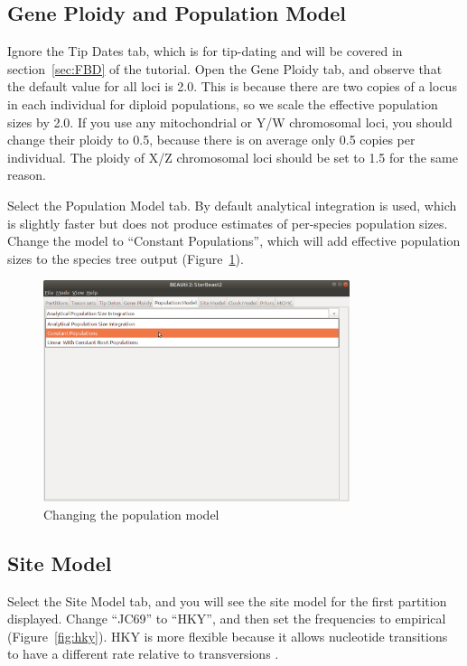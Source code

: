 \documentclass[12pt]{article}
\begin{document}
\subsection{Gene Ploidy and Population Model}
\label{subsec:ploidyAndPopModel}

Ignore the Tip Dates tab, which is for tip-dating and will be covered in
section~\ref{sec:FBD} of the tutorial. Open the Gene Ploidy tab, and observe that the default value
for all loci is 2.0. This is because there are two copies of a locus in each
individual for diploid populations, so we scale the effective population sizes
by 2.0. If you use any mitochondrial or Y/W chromosomal loci, you should
change their ploidy to 0.5, because there is on average only 0.5 copies per
individual. The ploidy of X/Z chromosomal loci should be set to 1.5 for the
same reason.

Select the Population Model tab. By default analytical integration is used,
which is slightly faster but does not produce estimates of per-species population sizes.
Change the model to ``Constant Populations'', which will add effective population
sizes to the species tree output (Figure~\ref{fig:constantPopulations}).

\begin{figure}[htb!]
\centering
\includegraphics[width=0.8\textwidth]{figures/constantPopulations.png}
\caption
{Changing the population model}
\label{fig:constantPopulations}
\end{figure}

\clearpage

\subsection{Site Model}
\label{subsec:siteModel}

Select the Site Model tab, and you will see the site model for the first partition
displayed. Change ``JC69'' to ``HKY'', and then set the frequencies to
empirical (Figure~\ref{fig:hky}).
HKY is more flexible because it allows nucleotide transitions to have a different
rate relative to transversions \parencite{Hasegawa1985}.
\end{document}
